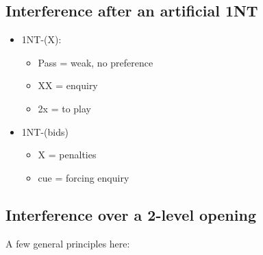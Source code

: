 \documentclass[a4paper,14pt]{extarticle}
\begin{document}
\subsection{Interference after an artificial 1NT}
\label{sec:intf:1N}

\begin{itemize}
\item 1NT-(X):
	\begin{itemize}
	\item Pass = weak, no preference
	\item XX = enquiry
	\item 2x = to play
	\end{itemize}
\item 1NT-(bids)
	\begin{itemize}
	\item X = penalties
	\item cue = forcing enquiry
	\end{itemize}
\end{itemize}


\subsection{Interference over a 2-level opening}
\label{sec:intf:2level}

A few general principles here:
\end{document}
